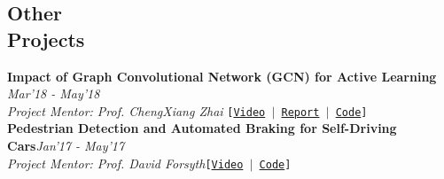 \documentclass[margin,line]{res}
\newenvironment{list2}{
  \begin{list}{$\bullet$}{%
      \setlength{\itemsep}{0in}
      \setlength{\parsep}{0in} \setlength{\parskip}{0in}
      \setlength{\topsep}{0in} \setlength{\partopsep}{0in} 
      \setlength{\leftmargin}{0.2in}}}{\end{list}}
\begin{document}
\begin{resume}
\section{\sc \large Other \\Projects} 
{\bf Impact of Graph Convolutional Network (GCN) for Active Learning} \hfill{\em Mar'18 - May'18}\\
{\em Project Mentor: Prof. ChengXiang Zhai} \hfill {\tt [\href{https://www.youtube.com/watch?v=V_XLsYSgiHk}{Video} $|$ \href{https://github.com/unnat/active_gcn_ner/blob/master/active-learning-gcn-report.pdf}{Report} $|$ \href{https://github.com/unnat/active_gcn_ner}{Code}]}\vspace{0.15in}\\
{\bf Pedestrian Detection and Automated Braking for Self-Driving Cars}{\hfill \em Jan'17 - May'17}\\
{\em Project Mentor: Prof. David Forsyth}{\hfill \tt [\href{https://www.youtube.com/watch?v=GqzZzr85BcQ}{Video} %
$|$ \href{https://github.com/tensorpro/MAAV}{Code}]}\vspace{-0.15in}\\


\end{resume}
\end{document}
